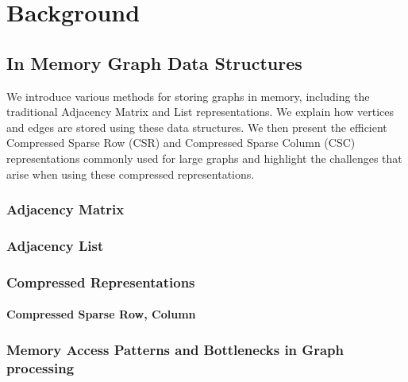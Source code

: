 
\chapter{Background}
\label{ch:Background}

\section{In Memory Graph Data Structures}
\par{
    We introduce various methods for storing graphs in memory, including the traditional Adjacency Matrix and List representations. We explain how vertices and edges are stored using these data structures. We then present the efficient Compressed Sparse Row (CSR) and Compressed Sparse Column (CSC) representations commonly used for large graphs and highlight the challenges that arise when using these compressed representations.
}
\subsection{Adjacency Matrix}
\subsection{Adjacency List}
\subsection{Compressed Representations}
\subsubsection{Compressed Sparse Row, Column}
\subsection{Memory Access Patterns and Bottlenecks in Graph processing}

